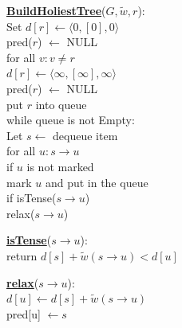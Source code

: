 \documentclass{article}
\begin{document}
\begin{minipage}[t]{0.48\linewidth}
\begin{algorithm}
\textbf{\underline{BuildHoliestTree}}($G, \tilde w , r$): \\ \quad
Set $d[r] \leftarrow \langle 0, [0], 0 \rangle$ \\ \quad \quad
    pred($r$) $\leftarrow$ NULL \\ \quad
for all $v : v \neq r$ \\ \quad \quad
    $d[r] \leftarrow \langle \infty, [\infty], \infty \rangle$ \\ \quad \quad
    pred($r$) $\leftarrow$ NULL \\ \quad
put $r$ into queue \\ \quad
while queue is not Empty: \\ \quad \quad
    Let $s \leftarrow$ dequeue item \\ \quad \quad
    for all $u: s \rightarrow u$ \\ \qquad \quad
        if $u$ is not marked \\ \quad \qquad \quad
           mark $u$ and put in the queue \\ \qquad \quad
        if isTense($s \rightarrow u$) \\ \quad \qquad \quad
           relax($s \rightarrow u$)
\end{algorithm}
\end{minipage}
\hfill%
\hspace{-4cm}
\begin{minipage}[t]{0.48\linewidth}
\begin{algorithm}
\textbf{\underline{isTense}}($s \rightarrow u$): \\ \quad
return $d[s] + \tilde w(s \rightarrow u) < d[u]$ \\

\end{algorithm}

\vspace{0.5cm}

\begin{algorithm}
\textbf{\underline{relax}}($s \rightarrow u$): \\ \quad
$d[u] \leftarrow d[s] + \tilde w(s \rightarrow u)$ \\ \quad
pred[u] $\leftarrow s$ \\
\end{algorithm}
\end{minipage}

\vspace{0.5cm}
\end{document}
